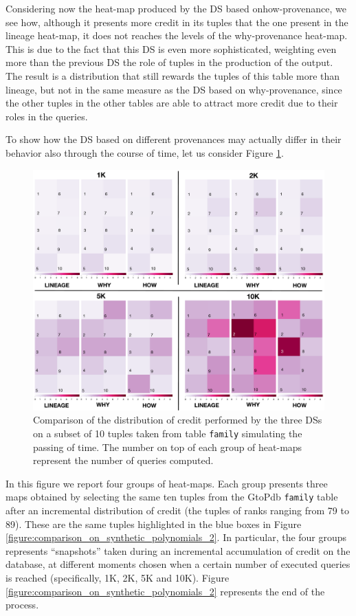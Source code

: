 Considering now the heat-map produced by the DS based onhow-provenance, we see how, although it presents more credit in its tuples that the one present in the lineage heat-map, it does not reaches the levels of the why-provenance heat-map.
This is due to the fact that this DS is even more sophisticated, weighting even more than the previous DS the role of tuples in the production of the output. 
The result is a distribution that still rewards the tuples of this table more than lineage, but not in the same measure as the DS based on why-provenance, since the other tuples in the other tables are able to attract more credit due to their roles in the queries. 


To show how the DS based on different provenances may actually differ in their behavior also through the course of time, let us consider Figure \ref{fig:comparison}.

\begin{figure}[t]
  \includegraphics[width=\textwidth]{figures/comparison_2}
  \caption{Comparison of the distribution of credit performed by the three DSs on a subset of 10 tuples taken from table \texttt{family} simulating the passing of time. The number on top of each group of heat-maps represent the number of queries computed.}
  \label{fig:comparison}
\end{figure}

In this figure we report four groups of heat-maps. Each group presents three maps obtained by selecting the same ten tuples from the GtoPdb \texttt{family} table after an incremental distribution of credit (the tuples of ranks ranging from 79 to 89). These are the same tuples highlighted in the blue boxes in Figure \ref{figure:comparison_on_synthetic_polynomials_2}.  In particular, the four groups represents ``snapshots'' taken during an incremental accumulation of credit on the database, at different moments chosen when a certain number of executed queries is reached (specifically, 1K, 2K, 5K and 10K).
Figure \ref{figure:comparison_on_synthetic_polynomials_2} represents the end of the process. 

